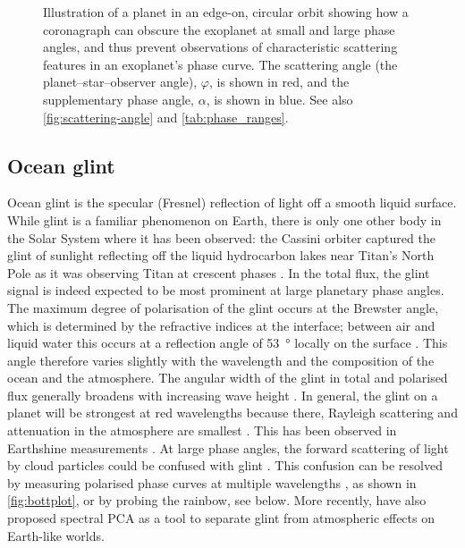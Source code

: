 \documentclass[usenatbib]{mnras}
\begin{document}
\begin{figure}
    \centering
    
    \caption{
        Illustration of a planet in an edge-on, circular orbit showing how a coronagraph can obscure the exoplanet at small and large phase angles, and thus prevent observations of characteristic scattering features in an exoplanet's phase curve. 
        The scattering angle (the planet--star--observer angle), $\varphi$, is shown in red, and the supplementary phase angle, $\alpha$, is shown in blue. 
        See also \cref{fig:scattering-angle} and \cref{tab:phase_ranges}.
    }
    \label{fig:annotated-orbit}
\end{figure}

\subsection{Ocean glint}

Ocean glint is the specular (Fresnel) reflection of light off a smooth liquid surface. 
%
While glint is a familiar phenomenon on Earth, there is only one other body in the Solar System where it has been observed: the Cassini orbiter captured the glint of sunlight reflecting off the liquid hydrocarbon lakes near Titan's North Pole as it was observing Titan at crescent phases \citep{2010GeoRL..37.7104S}.
%
In the total flux, the glint signal is indeed expected to be most prominent at large planetary phase angles.
%
The maximum degree of polarisation of the glint occurs at the Brewster angle, which is determined by the refractive indices at the interface; between air and liquid water this occurs at a reflection angle of \qty{53}{\degree} locally on the surface \citep[at a planetary phase angle of about \qty{106}{\degree}; see, e.g.,][]{Zugger_2010,treesandstam2019}.
%
This angle therefore varies slightly with the wavelength and the composition of the ocean and the atmosphere.
%
The angular width of the glint in total and polarised flux generally broadens with increasing wave height \citep{2008Icar..195..927W, kopparla2018, treesandstam2019, trees2022}.
In general, the glint on a planet will be strongest at red wavelengths because there, Rayleigh scattering and attenuation in the atmosphere are smallest \citep{Robinson_2010,Zugger_2011}. 
%
This has been observed in Earthshine measurements \citep{Emde2017,sterzik2019, takahashi2021}. 
%
At large phase angles, the forward scattering of light by cloud particles could be confused with glint \citep{Robinson_2010}.  
%
This confusion can be resolved by measuring polarised phase curves at multiple wavelengths \citep{treesandstam2019}, as shown in \cref{fig:bottplot}, or by probing the rainbow, see below.
%
More recently, \citet{Ryan_Robinson_2022} have also proposed spectral PCA as a tool to separate glint from atmospheric effects on Earth-like worlds.
\end{document}

